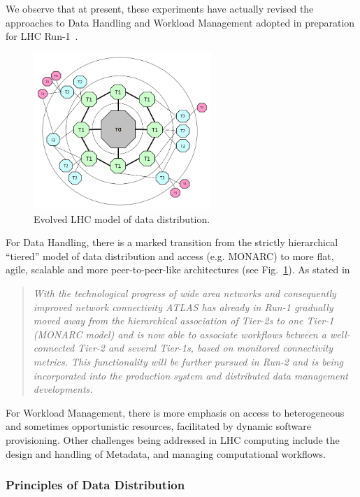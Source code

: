 We observe that at present, these experiments have actually revised the approaches to Data Handling and Workload
Management adopted in preparation for LHC Run-1~\cite{lhc_model_update}.
\begin{figure}[h!]
\centering
\includegraphics[width=0.6\textwidth]{un-monarc-model.png}
\caption{Evolved LHC model of data distribution.}
\label{fig:un-monarc}
\end{figure}
For Data Handling, there is a marked transition from the strictly hierarchical
“tiered” model of data distribution and access (e.g. MONARC) to more flat, agile, scalable and more peer-to-peer-like
architectures (see Fig.~\ref{fig:un-monarc}).
As stated in~\cite{lhc_model_update}
\begin{quotation}
\textit{With the technological progress of wide area networks and consequently improved network connectivity ATLAS has
already in Run-1 gradually moved away from the hierarchical association of Tier-2s to one Tier-1 (MONARC model)
and is now able to associate workflows between a well-connected Tier-2 and several Tier-1s, based on monitored
connectivity metrics. This functionality will be further pursued in Run-2 and is being incorporated into the production
system and distributed data management developments.}
\end{quotation}

\noindent
For Workload Management, there is more emphasis on access to heterogeneous and sometimes opportunistic resources, facilitated by dynamic software provisioning. Other challenges being addressed in LHC computing include the design and handling of Metadata, and managing computational workflows.


\subsubsection{Principles of Data Distribution}

